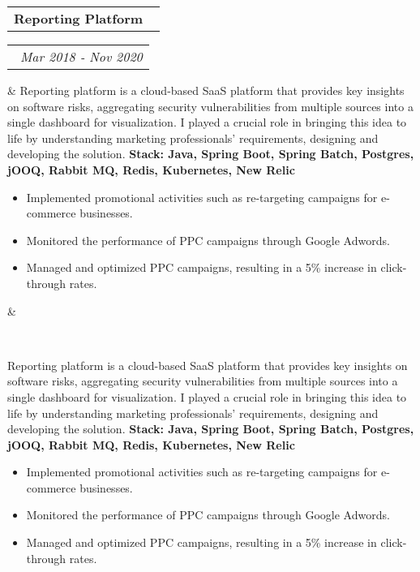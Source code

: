 \documentclass[14pt,a4paper,sans]{moderncv}
\makeatletter
\newcommand*{\customcventry}[7][.13em]{
    \begin{tabular}{@{}l}
    {\bfseries #4} \
        {\itshape #3}
    \end{tabular}
    \hfill
    \begin{tabular}{l@{}}
    {\bfseries #5} \
        {\itshape #2}
    \end{tabular}
    \ifx
        &#7&%
    \else
            {\
        \begin{minipage}{\maincolumnwidth}%
        \small#7%
        \end{minipage}}
    \fi%
    \par\addvspace{#1}}
\makeatother
\begin{document}
    \customcventry{Mar 2018 ‐ Nov 2020}{}{Reporting Platform}{}{}{
            {Reporting platform is a cloud-based SaaS platform that provides key insights on software risks, aggregating security vulnerabilities from multiple sources into a single dashboard for visualization. I played a crucial role in bringing this idea to life by understanding marketing professionals' requirements, designing and developing the solution.\newline{}}
            {\textbf{Stack: Java, Spring Boot, Spring Batch, Postgres, jOOQ, Rabbit MQ, Redis, Kubernetes, New Relic}}
            {\begin{itemize}[leftmargin=0.6cm, label={\textbullet}]
                 \item Implemented promotional activities such as re-targeting campaigns for e-commerce businesses.
                 \item Monitored the performance of PPC campaigns through Google Adwords.
                 \item Managed and optimized PPC campaigns, resulting in a 5\% increase in click-through rates.
        \end{itemize}}}

    \vspace{1em}
\end{document}
